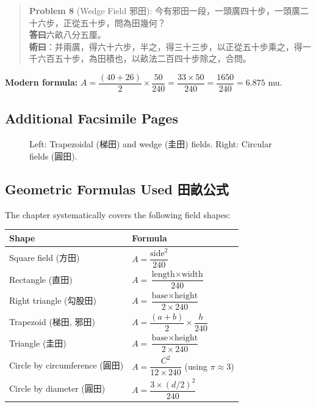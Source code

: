 \documentclass[11pt,a4paper]{article}
\newenvironment{problembox}{%
  \begin{quote}
  \itshape
  \color{problemcolor}
}{%
  \end{quote}
}
\begin{document}
\vspace{0.3cm}

\begin{problembox}
\textbf{Problem 8} (Wedge Field 邪田): 今有邪田一段，一頭廣四十步，一頭廣二十六步，正從五十步，問為田幾何？\\[0.2cm]
\textbf{答曰}六畝八分五厘。\\[0.2cm]
\textbf{術曰}：并兩廣，得六十六步，半之，得三十三步，以正從五十步乘之，得一千六百五十步，為田積也，以畝法二百四十步除之，合問。
\end{problembox}

\textbf{Modern formula:} $A = \dfrac{(40 + 26)}{2} \times \dfrac{50}{240} = \dfrac{33 \times 50}{240} = \dfrac{1650}{240} = 6.875$ mu.

\subsection{Additional Facsimile Pages}

\begin{figure}[H]
\centering
{}\hfill
{}
\caption{Left: Trapezoidal (梯田) and wedge (圭田) fields. Right: Circular fields (圓田).}
\end{figure}

\subsection{Geometric Formulas Used 田畝公式}

The chapter systematically covers the following field shapes:

\begin{center}
\begin{tabular}{ll}
\toprule
\textbf{Shape} & \textbf{Formula} \\
\midrule
Square field (方田) & $A = \dfrac{\text{side}^2}{240}$ \\
Rectangle (直田) & $A = \dfrac{\text{length} \times \text{width}}{240}$ \\
Right triangle (勾股田) & $A = \dfrac{\text{base} \times \text{height}}{2 \times 240}$ \\
Trapezoid (梯田, 邪田) & $A = \dfrac{(a+b)}{2} \times \dfrac{h}{240}$ \\
Triangle (圭田) & $A = \dfrac{\text{base} \times \text{height}}{2 \times 240}$ \\
Circle by circumference (圓田) & $A = \dfrac{C^2}{12 \times 240}$ (using $\pi \approx 3$) \\
Circle by diameter (圓田) & $A = \dfrac{3 \times (d/2)^2}{240}$ \\
\bottomrule
\end{tabular}
\end{center}
\end{document}
